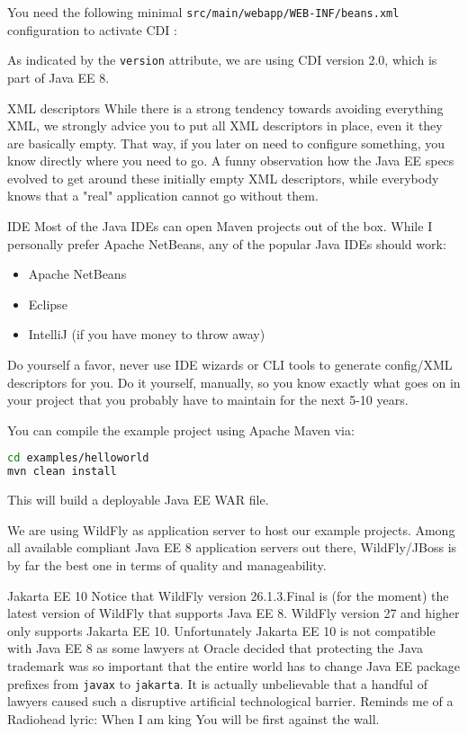 You need the following minimal \texttt{src/main/webapp/WEB-INF/beans.xml} configuration to activate CDI \cite{CDI2}:

As indicated by the \texttt{version} attribute, we are using CDI version 2.0, which is part of Java EE 8.
\begin{TIP}{XML descriptors}
While there is a strong tendency towards avoiding everything XML,
we strongly advice you to put all XML descriptors in place,
even it they are basically empty.
That way, if you later on need to configure something,
you know directly where you need  to go.
A  funny observation how  the Java EE specs evolved to get around these initially empty XML descriptors,
while everybody knows that a  "real" application cannot go without them.
\end{TIP}

\begin{TIP}{IDE}
Most of the Java IDEs can open Maven projects out of the box.
While I personally prefer Apache NetBeans,
any of the popular Java IDEs should work:
\begin{itemize}
	\item Apache NetBeans
	\item Eclipse
	\item IntelliJ (if you have money to throw away)
\end{itemize}
Do yourself a favor,
never use IDE wizards or CLI tools to generate config/XML descriptors for you.
Do it yourself, manually, so you know exactly what goes on in your project that you probably have to maintain for the next 5-10 years.
\end{TIP}

You can compile the example project using Apache Maven via:
\begin{lstlisting}[language=bash]
cd examples/helloworld
mvn clean install
\end{lstlisting}
This will build a deployable Java EE WAR file.

We are using WildFly \cite{WildFly} as application server to host our example projects.
Among all available compliant Java EE 8 application servers out there,
WildFly/JBoss is by far the best one in terms of quality and manageability.

\begin{ClownComputing}{Jakarta EE 10}
	Notice that WildFly version 26.1.3.Final is (for the moment) the latest version of WildFly that supports Java EE 8.
	WildFly version 27 and higher only supports Jakarta EE 10.
	Unfortunately Jakarta EE 10 is not compatible with Java EE 8 as some lawyers at Oracle decided that protecting the Java trademark was so important that the entire world has to change Java EE package prefixes from \texttt{javax} to \texttt{jakarta}.
	It is actually unbelievable that a handful of lawyers caused such a disruptive artificial technological barrier.
	Reminds me of a Radiohead lyric: When I am king
	You will be first against the wall.
\end{ClownComputing}

